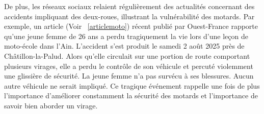 De plus, les réseaux sociaux relaient régulièrement des actualités concernant des accidents impliquant des deux-roues, illustrant la vulnérabilité des motards. Par exemple, un article (Voir ~\ref{articlemoto}) récent publié par Ouest-France rapporte qu'une jeune femme de 26 ans a perdu tragiquement la vie lors d'une leçon de moto-école dans l’Ain. L'accident s'est produit le samedi 2 août 2025 près de Châtillon-la-Palud. Alors qu'elle circulait sur une portion de route comportant plusieurs virages, elle a perdu le contrôle de son véhicule et percuté violemment une glissière de sécurité. La jeune femme n’a pas survécu à ses blessures. Aucun autre véhicule ne serait impliqué. Ce tragique événement rappelle une fois de plus l’importance d'améliorer constamment la sécurité des motards et l'importance de savoir bien aborder un virage.
\vspace{0.5cm}

